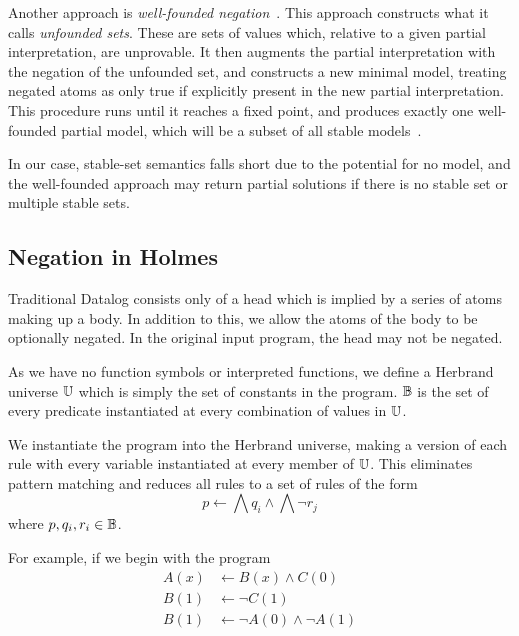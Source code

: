 Another approach is \emph{well-founded negation}~\cite{wellfounded}.
This approach constructs what it calls \emph{unfounded sets}.
These are sets of values which, relative to a given partial interpretation, are unprovable.
It then augments the partial interpretation with the negation of the unfounded set, and constructs a new minimal model, treating negated atoms as only true if explicitly present in the new partial interpretation.
This procedure runs until it reaches a fixed point, and produces exactly one well-founded partial model, which will be a subset of all stable models~\cite{wellfounded}.

In our case, stable-set semantics falls short due to the potential for no model, and the well-founded approach may return partial solutions if there is no stable set or multiple stable sets.
\subsection{Negation in Holmes}
Traditional Datalog consists only of a head which is implied by a series of atoms making up a body.
In addition to this, we allow the atoms of the body to be optionally negated.
In the original input program, the head may not be negated.

As we have no function symbols or interpreted functions, we define a Herbrand universe $\mathbb{U}$ which is simply the set of constants in the program.
$\mathbb{B}$ is the set of every predicate instantiated at every combination of values in $\mathbb{U}$.

We instantiate the program into the Herbrand universe, making a version of each rule with every variable instantiated at every member of $\mathbb{U}$.
This eliminates pattern matching and reduces all rules to a set of rules of the form
\[
	p \leftarrow \bigwedge q_i \wedge \bigwedge \neg r_j
\]
where $p, q_i, r_i \in \mathbb{B}$.

For example, if we begin with the program
\begin{align*}
A(x) &\leftarrow B(x) \wedge C(0)\\
B(1) &\leftarrow \neg C(1)\\
B(1) &\leftarrow \neg A(0) \wedge \neg A(1)
\end{align*}

